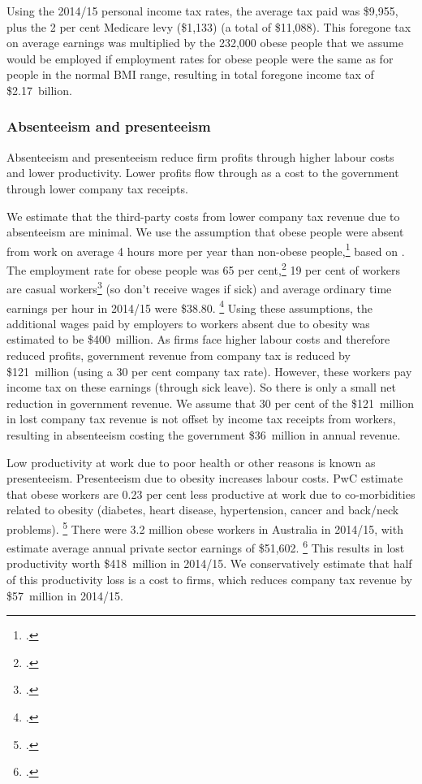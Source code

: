 \documentclass[embargoed]{grattan}
\begin{document}
Using the 2014/15 personal income tax rates, the average tax paid was \$9,955, plus the 2 per cent Medicare levy (\$1,133) (a total of \$11,088).
This foregone tax on average earnings was multiplied by the 232,000 obese people that we assume would be employed if employment rates for obese people were the same as for people in the normal BMI range, resulting in total foregone income tax of \$2.17~billion.

\subsubsection{Absenteeism and presenteeism}

Absenteeism and presenteeism reduce firm profits through higher labour costs and lower productivity.
Lower profits flow through as a cost to the government through lower company tax receipts.

We estimate that the third-party costs from lower company tax revenue due to absenteeism are minimal.
We use the assumption that obese people were absent from work on average 4 hours more per year than non-obese people,\footcite[][55]{PwC2015Weighingcostobesity} based on \textcite{ABS20134364055002AustralianHealth}.
The employment rate for obese people was 65 per cent,\footcite{ABS2013436405503AustralianHealth} 19 per cent of workers are casual workers\footcite{ABS201563333} (so don't receive wages if sick) and average ordinary time earnings per hour in 2014/15 were \$38.80.%
\footcite{ABS201663020AverageWeekly} Using these assumptions, the additional wages paid by employers to workers absent due to obesity was estimated to be \$400~million.
As firms face higher labour costs and therefore reduced profits, government revenue from company tax is reduced by \$121~million (using a 30 per cent company tax rate).
However, these workers pay income tax on these earnings (through sick leave).
So there is only a small net reduction in government revenue.
We assume that 30 per cent of the \$121~million in lost company tax revenue is not offset by income tax receipts from workers, resulting in absenteeism costing the government \$36~million in annual revenue.

Low productivity at work due to poor health or other reasons is known as presenteeism.
Presenteeism due to obesity increases labour costs.
PwC estimate that obese workers are 0.23 per cent less productive at work due to co-morbidities related to obesity (diabetes, heart disease, hypertension, cancer and back/neck problems).%
\footcite[][56]{PwC2015Weighingcostobesity} There were 3.2 million obese workers in Australia in 2014/15, with estimate average annual private sector earnings of \$51,602.%
\footcite{ABS201663020AverageWeekly} This results in lost productivity worth \$418~million in 2014/15.
We conservatively estimate that half of this productivity loss is a cost to firms, which reduces company tax revenue by \$57~million in 2014/15.
\end{document}
